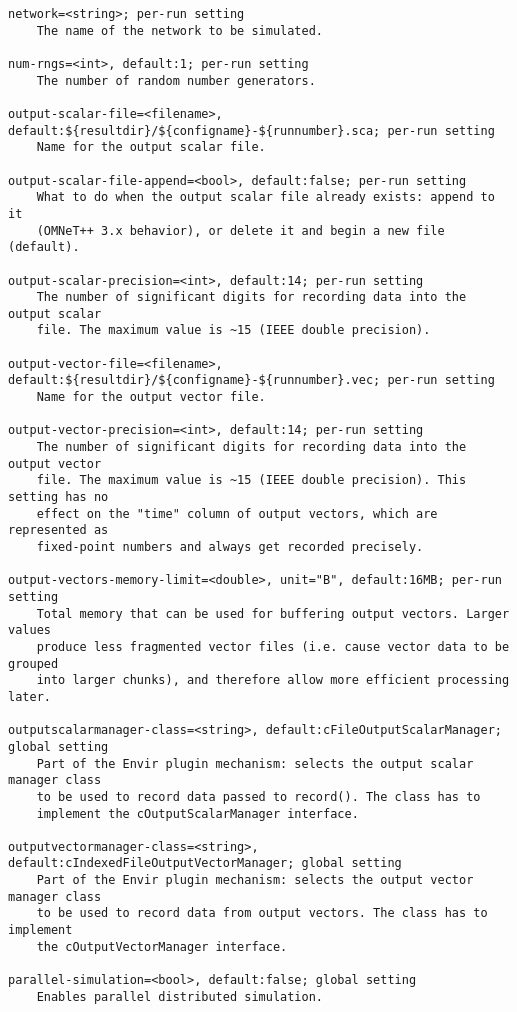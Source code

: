 \begin{verbatim}
network=<string>; per-run setting
    The name of the network to be simulated.

num-rngs=<int>, default:1; per-run setting
    The number of random number generators.

output-scalar-file=<filename>, default:${resultdir}/${configname}-${runnumber}.sca; per-run setting
    Name for the output scalar file.

output-scalar-file-append=<bool>, default:false; per-run setting
    What to do when the output scalar file already exists: append to it
    (OMNeT++ 3.x behavior), or delete it and begin a new file (default).

output-scalar-precision=<int>, default:14; per-run setting
    The number of significant digits for recording data into the output scalar
    file. The maximum value is ~15 (IEEE double precision).

output-vector-file=<filename>, default:${resultdir}/${configname}-${runnumber}.vec; per-run setting
    Name for the output vector file.

output-vector-precision=<int>, default:14; per-run setting
    The number of significant digits for recording data into the output vector
    file. The maximum value is ~15 (IEEE double precision). This setting has no
    effect on the "time" column of output vectors, which are represented as
    fixed-point numbers and always get recorded precisely.

output-vectors-memory-limit=<double>, unit="B", default:16MB; per-run setting
    Total memory that can be used for buffering output vectors. Larger values
    produce less fragmented vector files (i.e. cause vector data to be grouped
    into larger chunks), and therefore allow more efficient processing later.

outputscalarmanager-class=<string>, default:cFileOutputScalarManager; global setting
    Part of the Envir plugin mechanism: selects the output scalar manager class
    to be used to record data passed to record(). The class has to
    implement the cOutputScalarManager interface.

outputvectormanager-class=<string>, default:cIndexedFileOutputVectorManager; global setting
    Part of the Envir plugin mechanism: selects the output vector manager class
    to be used to record data from output vectors. The class has to implement
    the cOutputVectorManager interface.

parallel-simulation=<bool>, default:false; global setting
    Enables parallel distributed simulation.


\end{verbatim}

